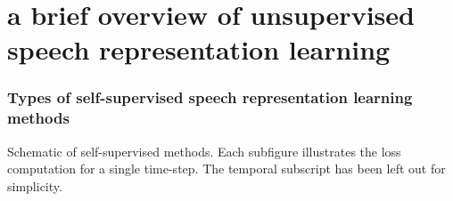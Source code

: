 \section[A Brief Overview of Unsupervised Speech Representation Learning]{a brief overview of unsupervised speech representation learning}\label{extra:brief}


\begin{frame}
    \frametitle{Types of self-supervised speech representation learning methods}
    
    Schematic of self-supervised methods. Each subfigure illustrates the loss computation for a single time-step. The temporal subscript has been left out for simplicity.

    \begin{figure}
        \centering
        \setlength\tabcolsep{1.5pt}
    \end{figure}
\end{frame}


